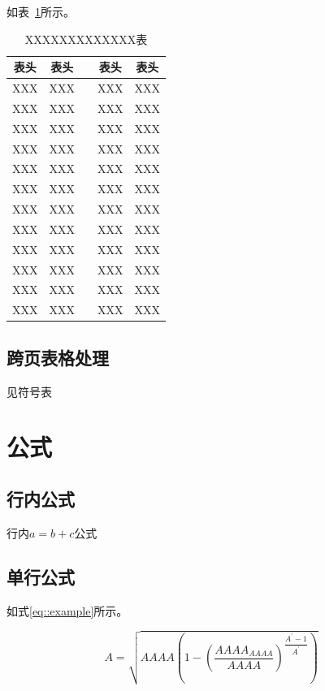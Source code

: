 	如表~\ref{tab::table_demo_1}所示。
	\begin{table}[htbp]
		\renewcommand{\arraystretch}{1.5}
		\centering
		\caption{XXXXXXXXXXXXX表}
		\begin{tabular}{c c p{10pt} c c} 
			\toprule %
			表头 & 表头 	&& 表头 & 表头\\ 
			\midrule %
			XXX& XXX &&  XXX & XXX\\ 
			XXX& XXX	 && XXX & XXX \\
			XXX& XXX 	 && XXX & XXX \\
			XXX & XXX	 && XXX & XXX \\
			XXX& XXX	 && XXX & XXX \\
			XXX & XXX	 && XXX & XXX \\
			XXX  & 	XXX && XXX & XXX \\
			XXX &  XXX	 && XXX & XXX \\
	 		XXX  & XXX	 && XXX &  XXX\\
	 		XXX  & XXX	 && XXX &  XXX\\
	 		XXX	& XXX	 && XXX &  XXX\\
	 		XXX    & XXX	 && XXX & XXX\\
			\bottomrule %
		\end{tabular}
		\label{tab::table_demo_1}
	\end{table}
	
	\subsection{跨页表格处理}
	
	见符号表
	
\section{公式}
\subsection{行内公式}

行内$a = b + c$公式


\subsection{单行公式}

如式\ref{eq::example}所示。

\begin{equation}\label{eq::example}
	A=\sqrt{AAAA\left(1-\left(\dfrac{AAAA_{AAAA}}{AAAA}\right)^{\dfrac{A^{\prime}-1}{A^{\prime}}}\right)} 
\end{equation}

